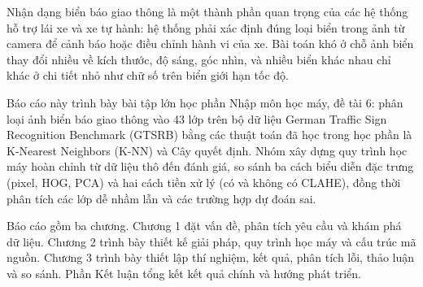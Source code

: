 
Nhận dạng biển báo giao thông là một thành phần quan trọng của các hệ thống hỗ trợ lái xe và xe tự hành: hệ thống phải xác định đúng loại biển trong ảnh từ camera để cảnh báo hoặc điều chỉnh hành vi của xe. Bài toán khó ở chỗ ảnh biển thay đổi nhiều về kích thước, độ sáng, góc nhìn, và nhiều biển khác nhau chỉ khác ở chi tiết nhỏ như chữ số trên biển giới hạn tốc độ.

Báo cáo này trình bày bài tập lớn học phần Nhập môn học máy, đề tài 6: phân loại ảnh biển báo giao thông vào 43 lớp trên bộ dữ liệu German Traffic Sign Recognition Benchmark (GTSRB) bằng các thuật toán đã học trong học phần là K-Nearest Neighbors (K-NN) và Cây quyết định. Nhóm xây dựng quy trình học máy hoàn chỉnh từ dữ liệu thô đến đánh giá, so sánh ba cách biểu diễn đặc trưng (pixel, HOG, PCA) và hai cách tiền xử lý (có và không có CLAHE), đồng thời phân tích các lớp dễ nhầm lẫn và các trường hợp dự đoán sai.

Báo cáo gồm ba chương. Chương 1 đặt vấn đề, phân tích yêu cầu và khám phá dữ liệu. Chương 2 trình bày thiết kế giải pháp, quy trình học máy và cấu trúc mã nguồn. Chương 3 trình bày thiết lập thí nghiệm, kết quả, phân tích lỗi, thảo luận và so sánh. Phần Kết luận tổng kết kết quả chính và hướng phát triển.
